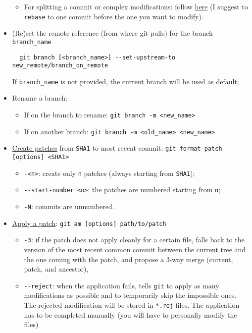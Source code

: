 \documentclass[a4paper,12pt,%
              final%
              ]{article}
\begin{document}
\begin{itemize}
\begin{itemize}
      \item For splitting a commit or complex modifications: follow \href{https://stackoverflow.com/questions/6217156/break-a-previous-commit-into-multiple-commits}{here} (I suggest to \texttt{rebase} to one commit before the one you want to modify).
    \end{itemize}
  \item (Re)set the remote reference (from where git pulls) for the branch \verb|branch_name|
\begin{verbatim}
  git branch [<branch_name>] --set-upstream-to new_remote/branch_on_remote
\end{verbatim}
    If \verb|branch_name| is not provided, the current branch will be used as default;
  \item Rename a branch:
    \begin{itemize}
      \item If on the branch to rename: \verb|git branch -m <new_name>|
      \item If on another branch: \verb|git branch -m <old_name> <new_name>|
    \end{itemize}
  \item \href{https://git-scm.com/docs/git-format-patch}{Create patches} from \texttt{SHA1} to most recent commit: \verb|git format-patch [options] <SHA1>|
    \begin{itemize}
      \item \texttt{-<n>}: create only \texttt{n} patches (always starting from \texttt{SHA1});
      \item \verb|--start-number <n>|: the patches are numbered starting from \texttt{n};
      \item \texttt{-N}: commits are unnumbered.
    \end{itemize}
  \item \href{https://git-scm.com/docs/git-am}{Apply a patch}: \verb|git am [options] path/to/patch|
    \begin{itemize}
      \item \texttt{-3}: if the patch does not apply cleanly for a certain file, falls back to the version of the most recent common commit between the current tree and the one coming with the patch, and propose a 3-way merge (current, patch, and ancestor),
      \item \verb|--reject|: when the application fails, tells \texttt{git} to apply as many modifications as possible and to temporarily skip the impossible ones. The rejected modification will be stored in \texttt{*.rej} files. The application has to be completed manually (you will have to personally modify the files)

\end{itemize}
\end{itemize}
\end{document}
